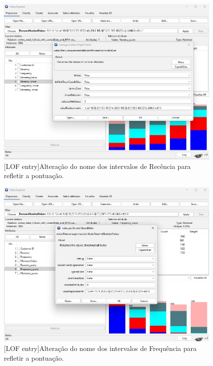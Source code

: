 \documentclass{easychair}
\begin{document}
\begin{figure}[H]
    \begin{centering}
    \includegraphics[width=0.85\linewidth]{imagens/figure9.jpg}\label{cap-3-fig9}
    [LOF entry]{Alteração do nome dos intervalos de Recência para refletir a pontuação.}
    \label{fig9}
    \end{centering}
\end{figure}

\begin{figure}[H]
    \begin{centering}
    \includegraphics[width=0.85\linewidth]{imagens/figure10.jpg}\label{cap-3-fig10}
    [LOF entry]{Alteração do nome dos intervalos de Frequência para refletir a pontuação.}
    \label{fig10}
    \end{centering}
\end{figure}
\end{document}
